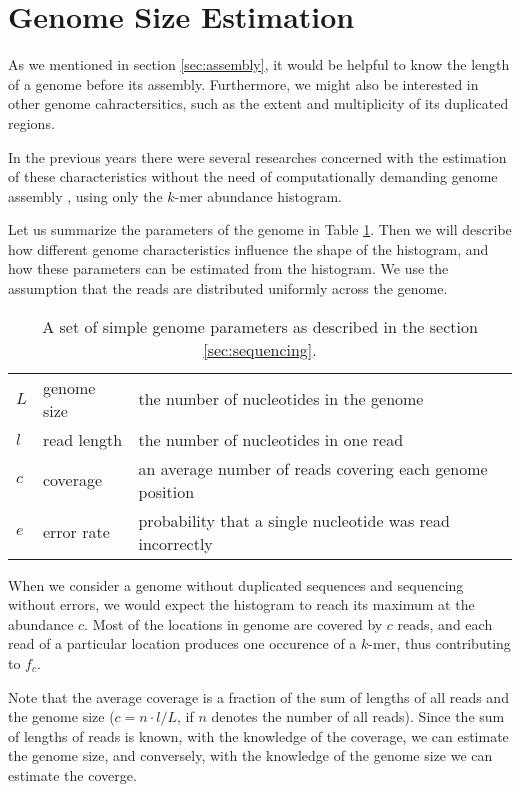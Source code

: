 \section{Genome Size Estimation}
\label{sec:intro-estimation}
As we mentioned in section \ref{sec:assembly}, it would be helpful to know the length of a genome 
before its assembly. Furthermore, we might also be interested in other genome cahractersitics,
such as the extent and multiplicity of its duplicated regions.

In the previous years there were several researches concerned with the estimation 
of these characteristics without the need of computationally demanding 
genome assembly \cite{Hozza2015, Williams2013, Melsted2014, Sivadasan2016}, using only the $k$-mer 
abundance histogram.

\medskip

Let us summarize the parameters of the genome in Table \ref{tab:genome-parameters}.
Then we will describe how different genome characteristics influence the shape of the histogram,
and how these parameters can be estimated from the histogram. We use the assumption that
the reads are distributed uniformly across the genome. 

\begin{table}[h!]
\centering
\begin{tabular}{ l l l }
 $L$ & genome size & the number of nucleotides in the genome \\  
 $l$ & read length & the number of nucleotides in one read \\
 $c$ & coverage & an average number of reads covering each genome position \\ 
 $e$ & error rate & probability that a single nucleotide was read incorrectly   
\end{tabular}
\caption{A set of simple genome parameters as described in the section \ref{sec:sequencing}.
\label{tab:genome-parameters}}
\end{table}

When we consider a genome without duplicated sequences and sequencing without errors, we
would expect the histogram to reach its maximum at the abundance $c$. 
Most of the locations in genome are covered by $c$ reads, and each read of a particular
location produces one occurence of a $k$-mer, thus contributing to $f_c$.

Note that the average coverage is a fraction of the sum of lengths of all reads
and the genome size ($c = n \cdot l/L$, if $n$ denotes the number of all reads). 
Since the sum of lengths of reads is known, with the knowledge of the coverage, we can estimate the 
genome size, and conversely, with the knowledge of the genome size we can estimate the coverge.

